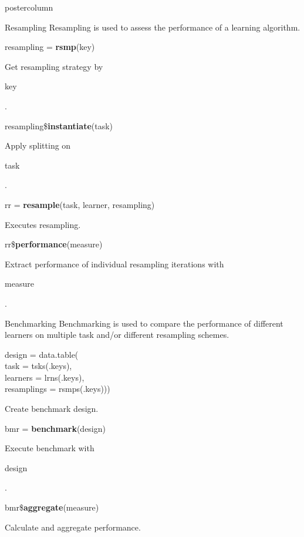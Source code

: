 \documentclass{beamer}
\newcommand{\codeinline}[1]{\begin{codeboxinline}#1\end{codeboxinline}}
\begin{document}
\begin{frame}[fragile]{}
\begin{columns}
\begin{column}{.245\textwidth}
\begin{beamercolorbox}[center]{postercolumn}
\begin{minipage}{.98\textwidth}
{						\begin{myblock}{Resampling}
							Resampling is used to assess the performance of a learning algorithm.
							\\
							\begin{codebox}
								resampling = \textbf{rsmp}(key)
							\end{codebox}
							Get resampling strategy by \codeinline{key}.
							\\
							\begin{codebox}
								resampling\$\textbf{instantiate}(task)
							\end{codebox}
							Apply splitting on \codeinline{task}.
							\\
							\begin{codebox}
								rr = \textbf{resample}(task, learner, resampling)
							\end{codebox}
							Executes resampling.
							\\
							\begin{codebox}
								rr\$\textbf{performance}(measure)
							\end{codebox}
							Extract performance of individual resampling iterations with \codeinline{measure}.
						\end{myblock}
						\begin{myblock}{Benchmarking}
							Benchmarking is used to compare the performance of different learners on multiple task and/or different resampling schemes.
							\\
							\begin{codeboxmultiline}[width=21.95cm]
								design = data.table(\\
								\hspace*{1ex}task = tsks(.keys),\\
								\hspace*{1ex}learners = lrns(.keys),\\
								\hspace*{1ex}resamplings = rsmps(.keys)))
							\end{codeboxmultiline}
							Create benchmark design.
							\\
							\begin{codebox}
								bmr = \textbf{benchmark}(design)
							\end{codebox}
							Execute benchmark with \codeinline{design}.
							\\
							\begin{codebox}
								bmr\$\textbf{aggregate}(measure)
							\end{codebox}
							Calculate and aggregate performance.
						\end{myblock}\vfill
					}
				\end{minipage}
			\end{beamercolorbox}
		\end{column}
	\end{columns}
\end{frame}
\end{document}
